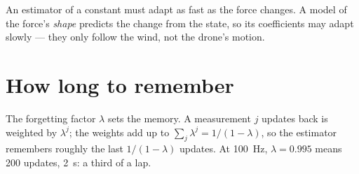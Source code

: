 \begin{keyidea}
An estimator of a constant must adapt as fast as the force changes. A model of the force's \emph{shape} predicts the change from the state, so its coefficients may adapt slowly — they only follow the wind, not the drone's motion.
\end{keyidea}

\section{How long to remember}

The forgetting factor $\lambda$ sets the memory. A measurement $j$ updates back is weighted by $\lambda^j$; the weights add up to $\sum_j\lambda^j = 1/(1 - \lambda)$, so the estimator remembers roughly the last $1/(1 - \lambda)$ updates. At \SI{100}{Hz}, $\lambda = 0.995$ means 200 updates, \SI{2}{s}: a third of a lap.


